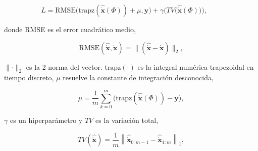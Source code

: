 \begin{equation}\label{eq:ap:1}
	L = \text {RMSE} \bigg (\text {trapz}({\hat {\dot {\mathbf {x}}}} (\Phi)) + \mu, {\mathbf {y}} \bigg) + \gamma \bigg ({TV}\big ({\hat {\dot {\mathbf {x}}}} (\Phi)\big)\bigg),\qquad 
\end{equation}


donde  RMSE es el error cuadrático medio,

\begin{equation}
\text {RMSE}({\hat {\dot {\mathbf {x}}}}, {\dot {\mathbf {x}}}) = \lVert ({\hat {\dot {\mathbf {x}}}} - {\dot {\mathbf {x}}})\rVert _{2},
\end{equation}

$\lVert{\cdot}\rVert _{2}$ es la 2-norma  del vector.  $\text{trapz}(\cdot)$ es la integral numérica trapezoidal en tiempo discreto, $\mu$ resuelve la constante de integración desconocida, 

\begin{equation} 
	\mu =\frac {1}{m}\sum _{k=0}^{m}\bigg (\text {trapz}({\hat {\dot {\mathbf {x}}}} (\Phi)) - {\mathbf {y}} \bigg),
	\end{equation}
	
$\gamma$ es un hiperparámetro y   $TV$ es la variación total,

\begin{equation} \label{eq:ap:2}
	TV({\hat {\dot {\mathbf {x}}}}) = \frac {1}{m}\left \lVert{ {\hat {\dot {\mathbf {x}}}} _{0:m-1}- {\hat {\dot {\mathbf {x}}}} _{1:m}}\right \rVert _{1},
	\end{equation}
	
